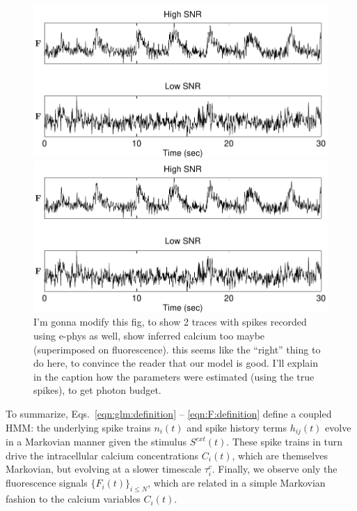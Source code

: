 \begin{figure}
\centering
\begin{minipage}[c]{0.45\hsize}
\includegraphics[width=\hsize]{../figs/example_traces}
\end{minipage}
\centering
\begin{minipage}[c]{0.45\hsize}
\includegraphics[width=\hsize]{../figs/example_traces}
\end{minipage}
\caption{I'm gonna modify this fig, to show 2 traces with spikes recorded using e-phys as well, show inferred calcium too maybe (superimposed on fluorescence).  this seems like the ``right'' thing to do here, to convince the reader that our model is good. I'll explain in the caption how the parameters were estimated (using the true spikes), to get photon budget.}
\label{fig:example_traces}
\end{figure}

To summarize, Eqs.~\eqref{eqn:glm:definition} -- \eqref{eqn:F:definition} define a coupled HMM: the underlying spike trains $n_i(t)$ and spike history terms $h_{ij}(t)$ evolve in a Markovian manner given the stimulus $S^{ext}(t)$. These spike trains in turn drive the intracellular calcium concentrations $C_i(t)$, which are themselves Markovian, but evolving at a slower timescale $\tau_i^c$. Finally, we observe only the fluorescence signals $\{F_i(t)\}_{i\leq N}$, which are related in a simple Markovian fashion to the calcium variables $C_i(t)$.


